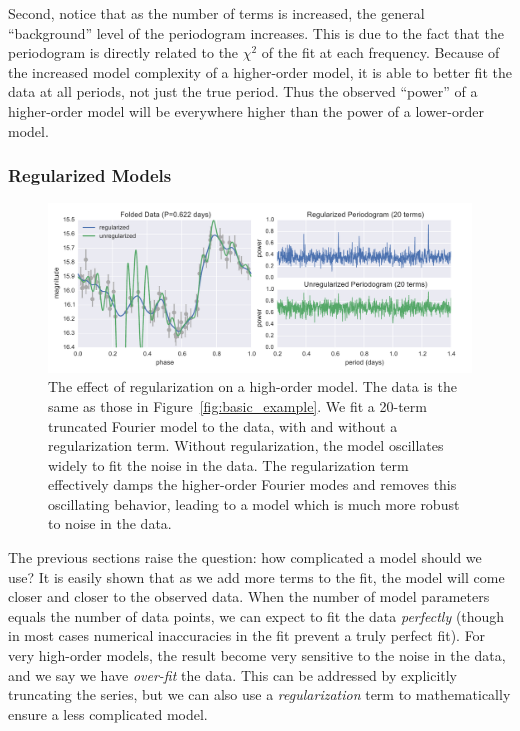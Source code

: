 \documentclass[12pt,preprint]{aastex}
\newcommand{\Fig}[1]{Figure~\ref{fig:#1}}
\newcommand{\fig}[1]{\Fig{#1}}
\newcommand{\figlabel}[1]{\label{fig:#1}}
\begin{document}
Second, notice that as the number of terms is increased, the general ``background'' level of the periodogram increases. This is due to the fact that the periodogram is directly related to the $\chi^2$ of the fit at each frequency. Because of the increased model complexity of a higher-order model, it is able to better fit the data at all periods, not just the true period. Thus the observed ``power'' of a higher-order model will be everywhere higher than the power of a lower-order model.

\subsubsection{Regularized Models \label{regularization}}


\begin{figure}
  \centering
  \includegraphics[width=\textwidth]{fig04.pdf}
  \caption{
    The effect of regularization on a high-order model. The data is the same as
    those in \fig{basic_example}. We fit a 20-term truncated Fourier model to
    the data, with and without a regularization term. Without regularization,
    the model oscillates widely to fit the noise in the data. The
    regularization term effectively damps the higher-order Fourier modes and
    removes this oscillating behavior, leading to a model which is much more
    robust to noise in the data.
  }
  \figlabel{regularized_example}
\end{figure}

The previous sections raise the question: how complicated a model should we use? It is easily shown that as we add more terms to the fit, the model will come closer and closer to the observed data. When the number of model parameters equals the number of data points, we can expect to fit the data {\it perfectly} (though in most cases numerical inaccuracies in the fit prevent a truly perfect fit). For very high-order models, the result become very sensitive to the noise in the data, and we say we have {\it over-fit} the data. This can be addressed by explicitly truncating the series, but we can also use a {\it regularization} term to mathematically ensure a less complicated model.
\end{document}
